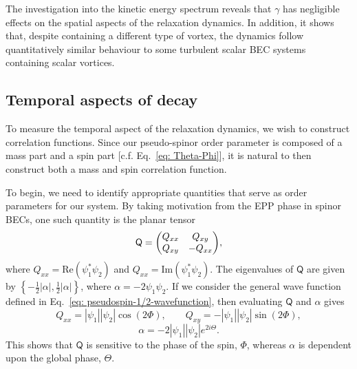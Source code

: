 The investigation into the kinetic energy spectrum reveals that \(\gamma \) has
negligible effects on the spatial aspects of the relaxation dynamics.
In addition, it shows that, despite containing a different type of vortex, the
dynamics follow quantitatively similar behaviour to some turbulent scalar BEC
systems containing scalar vortices.

\subsection{Temporal aspects of decay}
To measure the temporal aspect of the relaxation dynamics, we wish to
construct correlation functions.
Since our pseudo-spinor order parameter is composed of a mass part and a spin
part [c.f. Eq.~\eqref{eq: Theta-Phi}], it is natural to then construct both a
mass and spin correlation function.

To begin, we need to identify appropriate quantities that serve as order
parameters for our system.
By taking motivation from the EPP phase in spinor BECs, one such quantity is
the planar tensor~\cite{Symes2017}
\begin{equation}
    \mathsf{Q} = \mqty(Q_{xx} & Q_{xy} \\ Q_{xy} & -Q_{xx}),
\end{equation}
where \(Q_{xx} = \mathrm{Re}(\psi_1^*\psi_2)\) and
\(Q_{xx} = \mathrm{Im}(\psi_1^*\psi_2)\).
The eigenvalues of \(\mathsf{Q}\) are given by
\( \left\{-\frac{1}{2}|\alpha|, \frac{1}{2}|\alpha|\right\} \), where
\(\alpha=-2\psi_1\psi_2\).
If we consider the general wave function defined in
Eq.~\eqref{eq: pseudospin-1/2-wavefunction}, then evaluating \(\mathsf{Q}\) and
\(\alpha \) gives
\begin{equation}
    Q_{xx} = |\psi_1||\psi_2|\cos({2\Phi}), \qquad
    Q_{xy} = -|\psi_1||\psi_2|\sin({2\Phi}),
\end{equation}
\begin{equation}
    \alpha = -2|\psi_1||\psi_2|e^{2i\Theta}.
\end{equation}
This shows that \(\mathsf{Q}\) is sensitive to the phase of the spin,
\( \Phi \), whereas \(\alpha \) is dependent upon the global phase,
\( \Theta \).

